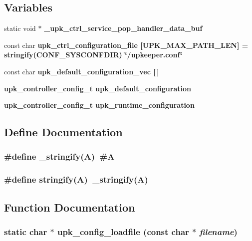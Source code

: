 \subsection*{Variables}
\begin{CompactItemize}
\item 
static void $\ast$ \bf{\_\-upk\_\-ctrl\_\-service\_\-pop\_\-handler\_\-data\_\-buf}
\item 
const char \bf{upk\_\-ctrl\_\-configuration\_\-file} [UPK\_\-MAX\_\-PATH\_\-LEN] = stringify(CONF\_\-SYSCONFDIR) \char`\"{}/upkeeper.conf\char`\"{}
\item 
const char \bf{upk\_\-default\_\-configuration\_\-vec} [$\,$]
\item 
\bf{upk\_\-controller\_\-config\_\-t} \bf{upk\_\-default\_\-configuration}
\item 
\bf{upk\_\-controller\_\-config\_\-t} \bf{upk\_\-runtime\_\-configuration}
\end{CompactItemize}


\subsection{Define Documentation}
\subsubsection{\setlength{\rightskip}{0pt plus 5cm}\#define \_\-stringify(A)~\#A}\label{group__config_g5fa590302383b2ba3c30e27642d6dad8}


\subsubsection{\setlength{\rightskip}{0pt plus 5cm}\#define stringify(A)~\_\-stringify(A)}\label{group__config_g268baf76cba325e7caeed79959905239}




\subsection{Function Documentation}
\subsubsection{\setlength{\rightskip}{0pt plus 5cm}static char $\ast$ upk\_\-config\_\-loadfile (const char $\ast$ {\em filename})\hspace{0.3cm}{\tt  [static]}}\label{group__config_gf991490ef830173b054fc41d4dcf88a0}


